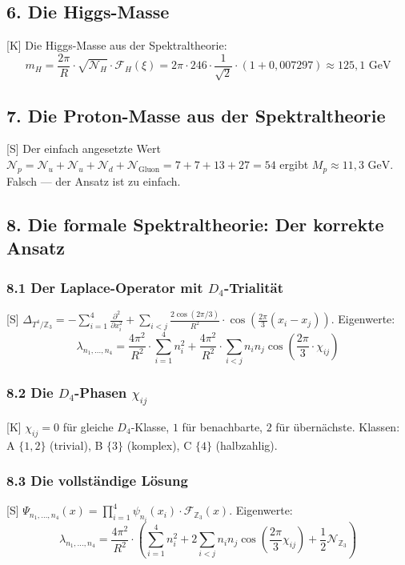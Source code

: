 \documentclass[11pt,a4paper]{article}
\begin{document}
	\subsection{6. Die Higgs-Masse}
	[K] Die Higgs-Masse aus der Spektraltheorie:
	\begin{equation}
		m_H = \frac{2\pi}{R} \cdot \sqrt{\mathcal{N}_H} \cdot \mathcal{F}_H(\xi) = 2\pi \cdot 246 \cdot \frac{1}{\sqrt{2}} \cdot (1 + 0{,}007297) \approx 125{,}1\text{ GeV}
	\end{equation}
	
	\subsection{7. Die Proton-Masse aus der Spektraltheorie}
	[S] Der einfach angesetzte Wert $\mathcal{N}_p = \mathcal{N}_u + \mathcal{N}_u + \mathcal{N}_d + \mathcal{N}_{\text{Gluon}} = 7 + 7 + 13 + 27 = 54$ ergibt $M_p \approx 11{,}3\text{ GeV}$. Falsch — der Ansatz ist zu einfach.
	
	\subsection{8. Die formale Spektraltheorie: Der korrekte Ansatz}
	\subsubsection{8.1 Der Laplace-Operator mit $D_4$-Trialität}
	[S] $\Delta_{T^4/\mathbb{Z}_3} = -\sum_{i=1}^4 \frac{\partial^2}{\partial x_i^2} + \sum_{i<j} \frac{2\cos(2\pi/3)}{R^2} \cdot \cos\left(\frac{2\pi}{3} (x_i - x_j)\right)$.
	Eigenwerte:
	\begin{equation}
		\lambda_{n_1,\ldots,n_4} = \frac{4\pi^2}{R^2} \cdot \sum_{i=1}^4 n_i^2 + \frac{4\pi^2}{R^2} \cdot \sum_{i<j} n_i n_j \cos\left(\frac{2\pi}{3} \cdot \chi_{ij}\right)
	\end{equation}
	
	\subsubsection{8.2 Die $D_4$-Phasen $\chi_{ij}$}
	[K] $\chi_{ij} = 0$ für gleiche $D_4$-Klasse, $1$ für benachbarte, $2$ für übernächste.
	Klassen: A $\{1,2\}$ (trivial), B $\{3\}$ (komplex), C $\{4\}$ (halbzahlig).
	
	\subsubsection{8.3 Die vollständige Lösung}
	[S] $\Psi_{n_1,\ldots,n_4}(x) = \prod_{i=1}^4 \psi_{n_i}(x_i) \cdot \mathcal{F}_{\mathbb{Z}_3}(x)$.
	Eigenwerte:
	\begin{equation}
		\lambda_{n_1,\ldots,n_4} = \frac{4\pi^2}{R^2} \cdot \left( \sum_{i=1}^4 n_i^2 + 2\sum_{i<j} n_i n_j \cos\left(\frac{2\pi}{3} \chi_{ij}\right) + \frac{1}{2} \mathcal{N}_{\mathbb{Z}_3} \right)
	\end{equation}
	
\end{document}

